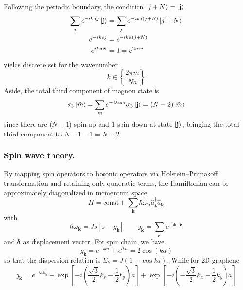\documentclass[../../../main.tex]{subfiles}
\begin{document}
Following the periodic boundary, the condition $\ket{j+N} = \ket{\mathbf{j}}$
\begin{align*}
    \sum_{j} e^{-ikaj} \ket{\mathbf{j}} & =  \sum_{j} e^{-ika(j+N)} \ket{j+N} \\
    e^{-ikaj}                           & = e^{-ika(j+N)}                     \\
    e^{ikaN}                            & = 1=e^{2n\pi i}
\end{align*}
yields discrete set for the wavenumber
\begin{equation*}
    k \in \left\{ \frac{2\pi m }{Na} \right\}
\end{equation*}
Aside, the total third component of magnon state is
\begin{equation*}
    \sigma_3 \ket{\tilde{m}} =\sum_{m} e^{-ikam} \sigma_3\ket{\mathbf{j}} = (N-2) \ket{\tilde{m}}
\end{equation*}
since there are ($N-1$) spin up and $1$ spin down at state $\ket{\mathbf{j}}$, bringing the total third component to $N-1-1=N-2$.


\subsubsection{Spin wave theory.}
By mapping spin operators to bosonic operators via Holstein–Primakoff transformation and retaining only quadratic terms, the Hamiltonian can be approximately diagonalized in momentum space
\begin{equation*}
    H = \text{const} + \sum_{\mathbf{k}} \hbar \omega_{\mathbf{k}}  \hat{a}_{\mathbf{k}}^\dagger \hat{a}_{\mathbf{k}}
\end{equation*}
with
\begin{equation*}
    \hbar \omega_{\mathbf{k }}
    = Js\left[z - g_\mathbf{k} \right]
    \qquad  g_\mathbf{k} = \sum_{\boldsymbol{\delta}} e^{-i \mathbf{k}\cdot \boldsymbol{\delta}}
\end{equation*}
and $\boldsymbol{\delta}$ as displacement vector.
For spin chain, we have
\begin{equation*}
    g_\mathbf{k} = e^{-ika}+e^{ika}=2\cos(ka)
\end{equation*}
so that the dispersion relation is $E_k = J(1- \cos ka)$.
While for 2D graphene
\begin{equation*}
    g_{\mathbf{k}} = e^{-i a k_y } +\exp \left[ -i\left(\frac{\sqrt{3}}{2}k_x-\frac{1}{2}k_y\right)a \right] + \exp \left[ -i\left(-\frac{\sqrt{3}}{2}k_x-\frac{1}{2}k_y\right)a \right]
\end{equation*}
\end{document}
